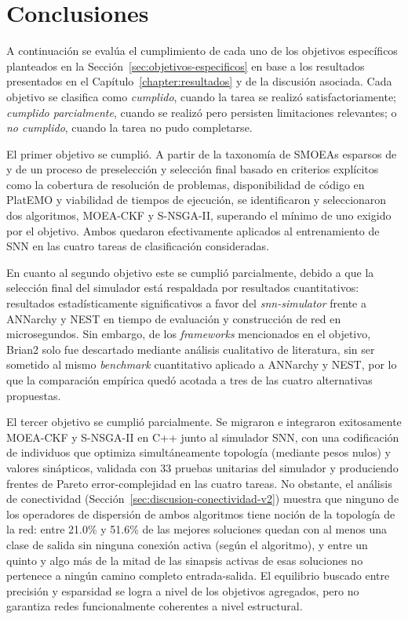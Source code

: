 \chapter{Conclusiones}\label{cap:conclusiones}

A continuación se evalúa el cumplimiento de cada uno de los objetivos específicos planteados en la Sección~\ref{sec:objetivos-especificos} en base a los resultados presentados en el Capítulo~\ref{chapter:resultados} y de la discusión asociada. Cada objetivo se clasifica como \textit{cumplido}, cuando la tarea se realizó satisfactoriamente; \textit{cumplido parcialmente}, cuando se realizó pero persisten limitaciones relevantes; o \textit{no cumplido}, cuando la tarea no pudo completarse.

El primer objetivo se cumplió. A partir de la taxonomía de SMOEAs esparsos de \cite{Shao2025_SMOEA} y de un proceso de preselección y selección final basado en criterios explícitos como la cobertura de resolución de problemas, disponibilidad de código en PlatEMO y viabilidad de tiempos de ejecución, se identificaron y seleccionaron dos algoritmos, MOEA-CKF y S-NSGA-II, superando el mínimo de uno exigido por el objetivo. Ambos quedaron efectivamente aplicados al entrenamiento de SNN en las cuatro tareas de clasificación consideradas.

En cuanto al segundo objetivo este se cumplió parcialmente, debido a que la selección final del simulador está respaldada por resultados cuantitativos: resultados estadísticamente significativos a favor del \textit{snn-simulator} frente a ANNarchy y NEST en tiempo de evaluación y construcción de red en microsegundos. Sin embargo, de los \textit{frameworks} mencionados en el objetivo, Brian2 solo fue descartado mediante análisis cualitativo de literatura, sin ser sometido al mismo \textit{benchmark} cuantitativo aplicado a ANNarchy y NEST, por lo que la comparación empírica quedó acotada a tres de las cuatro alternativas propuestas.

El tercer objetivo se cumplió parcialmente. Se migraron e integraron exitosamente MOEA-CKF y S-NSGA-II en C++ junto al simulador SNN, con una codificación de individuos que optimiza simultáneamente topología (mediante pesos nulos) y valores sinápticos, validada con 33 pruebas unitarias del simulador y produciendo frentes de Pareto error-complejidad en las cuatro tareas. No obstante, el análisis de conectividad (Sección~\ref{sec:discusion-conectividad-v2}) muestra que ninguno de los operadores de dispersión de ambos algoritmos tiene noción de la topología de la red: entre 21.0\% y 51.6\% de las mejores soluciones quedan con al menos una clase de salida sin ninguna conexión activa (según el algoritmo), y entre un quinto y algo más de la mitad de las sinapsis activas de esas soluciones no pertenece a ningún camino completo entrada-salida. El equilibrio buscado entre precisión y esparsidad se logra a nivel de los objetivos agregados, pero no garantiza redes funcionalmente coherentes a nivel estructural.

